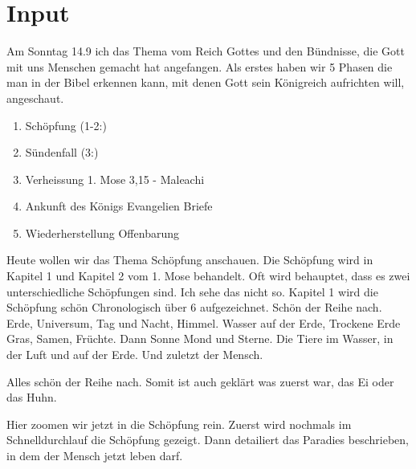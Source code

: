 \documentclass{../../inc/mybib}
\begin{document}
\section{ Input }
\begin{spacing}{1.5}    
    \begin{block}[Einleitung]
        Am Sonntag 14.9 ich das Thema vom Reich Gottes und den Bündnisse, die Gott mit uns Menschen gemacht hat angefangen. Als erstes haben wir 5 Phasen die man in der Bibel erkennen kann, mit denen Gott sein Königreich aufrichten will, angeschaut.
    \end{block}

    \begin{enumerate}
    \item Schöpfung (1-2:)\\ 
    \item Sündenfall (3:)\\
    \item Verheissung 1. Mose 3,15 - Maleachi\\
    \item Ankunft des Königs Evangelien Briefe\\
    \item Wiederherstellung Offenbarung\\
   \end{enumerate}
        
    \begin{block}
       Heute wollen wir das Thema Schöpfung anschauen. Die Schöpfung wird in Kapitel 1 und Kapitel 2 vom 1. Mose behandelt. Oft wird behauptet, dass es zwei unterschiedliche Schöpfungen sind. Ich sehe das nicht so. Kapitel 1 wird die Schöpfung schön Chronologisch über 6 aufgezeichnet. Schön der Reihe nach. Erde, Universum, Tag und Nacht, Himmel. Wasser auf der Erde, Trockene Erde Gras, Samen, Früchte. Dann Sonne Mond und Sterne. Die Tiere im Wasser, in der Luft und auf der Erde. Und zuletzt der Mensch.

       Alles schön der Reihe nach. Somit ist auch geklärt was zuerst war, das Ei oder das Huhn. 
    \end{block}
  
   \begin{block}
   Hier zoomen wir jetzt in die Schöpfung rein. Zuerst wird nochmals im Schnelldurchlauf die Schöpfung gezeigt. Dann detailiert das Paradies beschrieben, in dem der Mensch jetzt leben darf.
   \end{block}
   
\end{spacing}
\end{document}
